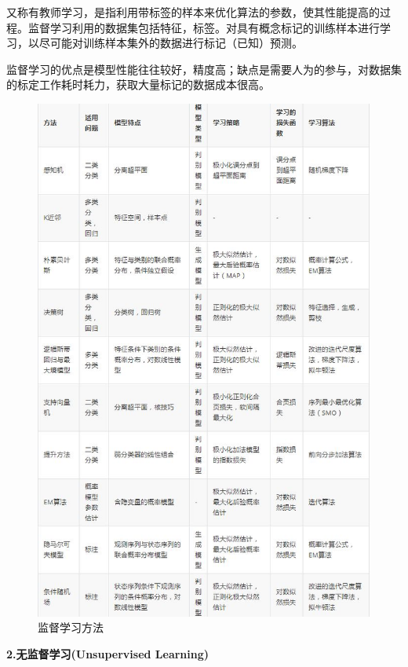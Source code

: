\documentclass[openbib]{article}
\begin{document}
又称有教师学习，是指利用带标签的样本来优化算法的参数，使其性能提高的过程。监督学习利用的数据集包括特征，标签。对具有概念标记的训练样本进行学习，以尽可能对训练样本集外的数据进行标记（已知）预测。

监督学习的优点是模型性能往往较好，精度高；缺点是需要人为的参与，对数据集的标定工作耗时耗力，获取大量标记的数据成本很高。

	\begin{figure}[htbp]
		\centering
		\includegraphics[scale=0.5]{监督学习方法}
		\caption{监督学习方法}
	\end{figure}

\begin{center}
	\textbf{2.无监督学习(Unsupervised Learning)}
\end{center}
\end{document}
